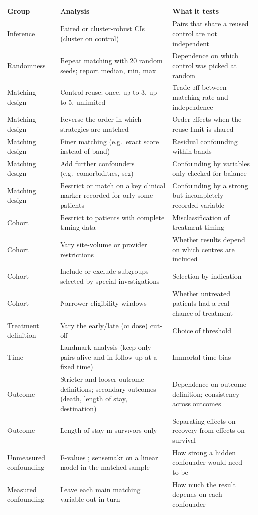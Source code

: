 \begin{xltabular}{\textwidth}{L{2.6cm}YY}
\toprule
\textbf{Group} & \textbf{Analysis} & \textbf{What it tests} \\
\midrule
\endhead
Inference & Paired or cluster-robust CIs (cluster on control) & Pairs that share a reused control are not independent \\
Randomness & Repeat matching with 20 random seeds; report median, min, max & Dependence on which control was picked at random \\
Matching design & Control reuse: once, up to 3, up to 5, unlimited & Trade-off between matching rate and independence \\
Matching design & Reverse the order in which strategies are matched & Order effects when the reuse limit is shared \\
Matching design & Finer matching (e.g.\ exact score instead of band) & Residual confounding within bands \\
Matching design & Add further confounders (e.g.\ comorbidities, sex) & Confounding by variables only checked for balance \\
Matching design & Restrict or match on a key clinical marker recorded for only some patients & Confounding by a strong but incompletely recorded variable \\
Cohort & Restrict to patients with complete timing data & Misclassification of treatment timing \\
Cohort & Vary site-volume or provider restrictions & Whether results depend on which centres are included \\
Cohort & Include or exclude subgroups selected by special investigations & Selection by indication \\
Cohort & Narrower eligibility windows & Whether untreated patients had a real chance of treatment \\
Treatment definition & Vary the early/late (or dose) cut-off & Choice of threshold \\
Time & Landmark analysis (keep only pairs alive and in follow-up at a fixed time) & Immortal-time bias \cite{hernan2016immortal} \\
Outcome & Stricter and looser outcome definitions; secondary outcomes (death, length of stay, destination) & Dependence on outcome definition; consistency across outcomes \\
Outcome & Length of stay in survivors only & Separating effects on recovery from effects on survival \\
Unmeasured confounding & E-values \cite{vanderweele2017evalue}; sensemakr \cite{cinelli2020} on a linear model in the matched sample & How strong a hidden confounder would need to be \\
Measured confounding & Leave each main matching variable out in turn & How much the result depends on each confounder \\
\bottomrule
\end{xltabular}

